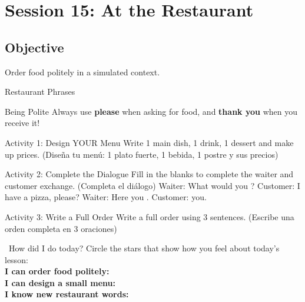 \section*{Session 15: At the Restaurant}

\subsection*{Objective}
Order food politely in a simulated context.

\begin{vocabcard}{Restaurant Phrases}
\end{vocabcard}

\begin{grammartip}{Being Polite}
  Always use \textbf{please} when asking for food, and \textbf{thank you} when you receive it!
\end{grammartip}

\begin{activity}{Activity 1: Design YOUR Menu}
  Write 1 main dish, 1 drink, 1 dessert and make up prices. (Diseña tu menú: 1 plato fuerte, 1 bebida, 1 postre y sus precios)
  \writinglines[3]
\end{activity}

\begin{activity}{Activity 2: Complete the Dialogue}
  Fill in the blanks to complete the waiter and customer exchange. (Completa el diálogo)
  Waiter: What would you \answerline[3cm]?
  Customer: \answerline[3cm] I have a pizza, please?
  Waiter: Here you \answerline[3cm].
  Customer: \answerline[3cm] you.
\end{activity}

\begin{activity}{Activity 3: Write a Full Order}
  Write a full order using 3 sentences. (Escribe una orden completa en 3 oraciones)
  \writinglines[3]
\end{activity}

\vspace{1em}
\begin{grammartip}{ \ How did I do today?}
  Circle the stars that show how you feel about today's lesson:\\[6pt]
  \textbf{I can order food politely:} \selfcheck[0] \\[4pt]
  \textbf{I can design a small menu:} \selfcheck[0] \\[4pt]
  \textbf{I know new restaurant words:} \selfcheck[0]
\end{grammartip}
